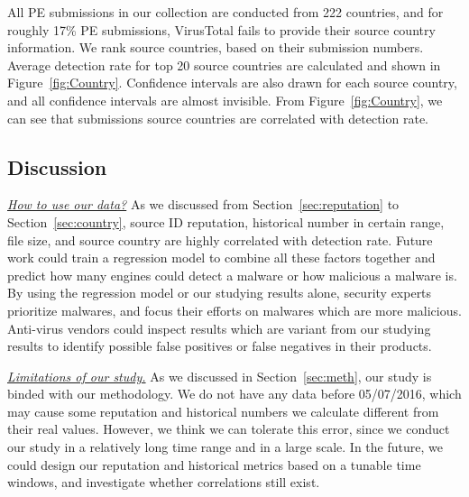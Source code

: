 All PE submissions in our collection are conducted from 222 countries, 
and for roughly 17\% PE submissions, 
VirusTotal fails to provide their source country information. 
We rank source countries, based on their submission numbers. 
Average detection rate for top 20 source countries are calculated and shown in 
Figure~\ref{fig:Country}. 
Confidence intervals are also drawn for each source country, 
and all confidence intervals are almost invisible. 
From Figure~\ref{fig:Country}, 
we can see that submissions source countries are correlated with detection rate.

\subsection{Discussion}

{\textit{\underline{How to use our data?}}}
As we discussed from Section~\ref{sec:reputation} to Section~\ref{sec:country}, 
source ID reputation, historical number in certain range, file size, 
and source country are highly correlated with detection rate. 
Future work could train a regression model to combine all these factors together and 
predict how many engines could detect a malware or how malicious a malware is. 
By using the regression model or our studying results alone, 
security experts prioritize malwares, and focus their efforts on malwares which are more malicious. 
Anti-virus vendors could inspect results which are variant from our studying results 
to identify possible false positives or false negatives in their products. 

{\textit{\underline{Limitations of our study.}}}
As we discussed in Section~\ref{sec:meth}, our study is binded with our methodology.
We do not have any data before 05/07/2016, 
which may cause some reputation and historical numbers 
we calculate different from their real values. 
However, we think we can tolerate this error, 
since we conduct our study in a relatively long time range and in a large scale. 
In the future, we could design our reputation and historical metrics based on a tunable time windows, and investigate whether correlations still exist.   